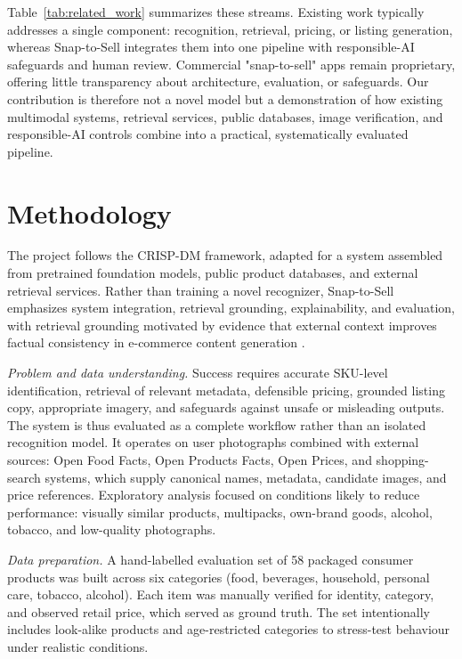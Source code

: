 \documentclass[conference]{IEEEtran}
\begin{document}
Table~\ref{tab:related_work} summarizes these streams. Existing work typically
addresses a single component: recognition, retrieval, pricing, or listing
generation, whereas Snap-to-Sell integrates them into one pipeline with
responsible-AI safeguards and human review. Commercial "snap-to-sell" apps
remain proprietary, offering little transparency about architecture, evaluation,
or safeguards. Our contribution is therefore not a novel model but a
demonstration of how existing multimodal systems, retrieval services, public
databases, image verification, and responsible-AI controls combine into a
practical, systematically evaluated pipeline.

\section{Methodology}

The project follows the CRISP-DM framework, adapted for a system assembled from
pretrained foundation models, public product databases, and external retrieval
services. Rather than training a novel recognizer, Snap-to-Sell emphasizes
system integration, retrieval grounding, explainability, and evaluation, with
retrieval grounding motivated by evidence that external context improves factual
consistency in e-commerce content generation \cite{li2024modict}.

\textit{Problem and data understanding.} Success requires accurate SKU-level
identification, retrieval of relevant metadata, defensible pricing, grounded
listing copy, appropriate imagery, and safeguards against unsafe or misleading
outputs. The system is thus evaluated as a complete workflow rather than an
isolated recognition model. It operates on user photographs combined with
external sources: Open Food Facts, Open Products Facts, Open Prices, and
shopping-search systems, which supply canonical names, metadata, candidate
images, and price references. Exploratory analysis focused on conditions likely
to reduce performance: visually similar products, multipacks, own-brand goods,
alcohol, tobacco, and low-quality photographs.

\textit{Data preparation.} A hand-labelled evaluation set of 58 packaged
consumer products was built across six categories (food, beverages, household,
personal care, tobacco, alcohol). Each item was manually verified for identity,
category, and observed retail price, which served as ground truth. The set
intentionally includes look-alike products and age-restricted categories to
stress-test behaviour under realistic conditions.
\end{document}
